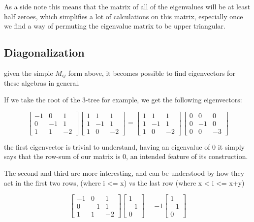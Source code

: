 \documentclass{report}
\begin{document}
As a side note this means that the matrix of all of the eigenvalues will be
at least half zeroes, which simplifies a lot of calculations on this
matrix, especially once we find a way of permuting the eigenvalue matrix to be
upper triangular.

\subsection{Diagonalization}

given the simple $M_{ij}$ form above, it becomes possible to find eigenvectors
for these algebras in general.

If we take the root of the 3-tree for example, we get the following
eigenvectors:

\begin{equation*}
\left[\begin{matrix}
	-1 & 0 & 1\\
	0 & -1 & 1\\
	1 & 1 & -2
\end{matrix}\right]
\left[\begin{matrix}
	1 & 1 & 1\\
	1 & -1 & 1\\
	1 & 0 & -2
\end{matrix}\right]
=
\left[\begin{matrix}
	1 & 1 & 1\\
	1 & -1 & 1\\
	1 & 0 & -2
\end{matrix}\right]
\left[\begin{matrix}
	0 & 0 & 0\\
	0 & -1 & 0\\
	0 & 0 & -3
\end{matrix}\right]
\end{equation*}

the first eigenvector is trivial to understand, having an eigenvalue of 0 it
simply says that the row-sum of our matrix is 0, an intended feature of its
construction.

The second and third are more interesting, and can be understood by how they
act in the first two rows, (where i <= x) vs the last row (where x < i <= x+y)

\begin{equation*}
\left[\begin{matrix}
	-1 & 0 & 1\\
	0 & -1 & 1\\
	1 & 1 & -2
\end{matrix}\right]
\left[\begin{matrix}
	1\\
	-1\\
	0
\end{matrix}\right]
=
-1
\left[\begin{matrix}
	1\\
	-1\\
	0
\end{matrix}\right]
\end{equation*}
\end{document}

